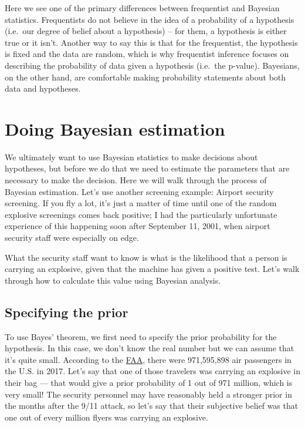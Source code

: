 \documentclass[
  12pt,
]{book}
\begin{document}
Here we see one of the primary differences between frequentist and Bayesian statistics. Frequentists do not believe in the idea of a probability of a hypothesis (i.e.~our degree of belief about a hypothesis) -- for them, a hypothesis is either true or it isn't. Another way to say this is that for the frequentist, the hypothesis is fixed and the data are random, which is why frequentist inference focuses on describing the probability of data given a hypothesis (i.e.~the p-value). Bayesians, on the other hand, are comfortable making probability statements about both data and hypotheses.

\hypertarget{doing-bayesian-estimation}{%
\section{Doing Bayesian estimation}\label{doing-bayesian-estimation}}

We ultimately want to use Bayesian statistics to make decisions about hypotheses, but before we do that we need to estimate the parameters that are necessary to make the decision. Here we will walk through the process of Bayesian estimation. Let's use another screening example: Airport security screening. If you fly a lot, it's just a matter of time until one of the random explosive screenings comes back positive; I had the particularly unfortunate experience of this happening soon after September 11, 2001, when airport security staff were especially on edge.

What the security staff want to know is what is the likelihood that a person is carrying an explosive, given that the machine has given a positive test. Let's walk through how to calculate this value using Bayesian analysis.

\hypertarget{specifying-the-prior}{%
\subsection{Specifying the prior}\label{specifying-the-prior}}

To use Bayes' theorem, we first need to specify the prior probability for the hypothesis. In this case, we don't know the real number but we can assume that it's quite small. According to the \href{https://www.faa.gov/air_traffic/by_the_numbers/media/Air_Traffic_by_the_Numbers_2018.pdf}{FAA}, there were 971,595,898 air passengers in the U.S. in 2017. Let's say that one of those travelers was carrying an explosive in their bag --- that would give a prior probability of 1 out of 971 million, which is very small! The security personnel may have reasonably held a stronger prior in the months after the 9/11 attack, so let's say that their subjective belief was that one out of every million flyers was carrying an explosive.
\end{document}
